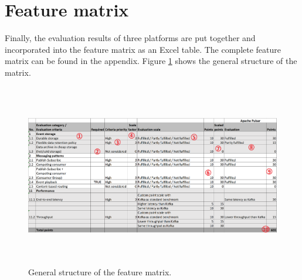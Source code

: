 \section{Feature matrix} 
Finally, the evaluation results of three platforms are put together and incorporated into the feature matrix as an Excel table. The complete feature matrix can be found in the appendix. Figure \ref{fig:featurematrix} shows the general structure of the matrix.
\newpage

\begin{figure}[h]
	\begin{adjustwidth}{-1.5cm}{}
	\centering
	\includegraphics[width=18cm,height=8cm]{images/feature-matrix.png}
	\end{adjustwidth}
	\caption{General structure of the feature matrix.}
	\label{fig:featurematrix}
\end{figure}

